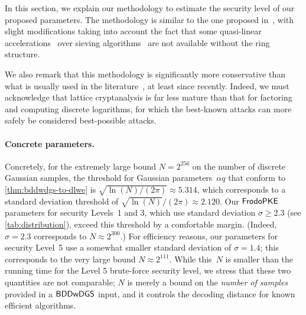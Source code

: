
In this section, we explain our methodology to estimate the security
level of our proposed parameters. The methodology is similar to the
one proposed in~\cite{USENIX:ADPS16}, with slight modifications taking
into account the fact that some quasi-linear
accelerations~\cite{AFRICACRYPT:Schneider13,BNP_IJAC16} over sieving
algorithms~\cite{SODA:BDGL16,LaarhovenThesis} are not available
without the ring structure.

We also remark that this methodology is significantly more
conservative than what is usually used in the
literature~\cite{albrecht15:_concrete_lwe}, at least since
recently. Indeed, we must acknowledge that lattice cryptanalysis is
far less mature than that for factoring and computing discrete
logarithms, for which the best-known attacks can more safely be
considered best-possible attacks.


\paragraph{Concrete parameters.}


Concretely, for the extremely large bound $N = 2^{256}$ on the
number of discrete Gaussian samples, the threshold for Gaussian
parameters~$\alpha q$ that conform to \autoref{thm:bddwdgs-to-dlwe} is
$\sqrt{\ln(N)/(2\pi)} \approx 5.314$, which corresponds to a standard
deviation threshold of $\sqrt{\ln(N)}/(2\pi) \approx 2.120$.  Our
$\textsf{\upshape\mdseries FrodoPKE}$ parameters for security Levels~1 and 3, which use standard
deviation $\sigma \geq 2.3$ (see \autoref{tab:distribution}), exceed
this threshold by a comfortable margin.  (Indeed, $\sigma = 2.3$
corresponds to $N \approx 2^{300}$.) For efficiency reasons, our
parameters for security Level~5 use a somewhat smaller standard
deviation of $\sigma = 1.4$; this corresponds to the very large bound
$N \approx 2^{111}$. While this~$N$ is smaller than the running time
for the Level 5 brute-force security level, we stress that these two
quantities are not comparable; $N$ is merely a bound on the
\emph{number of samples} provided in a $\mathsf{BDDwDGS}$ input, and it
controls the decoding distance for known efficient algorithms. 


